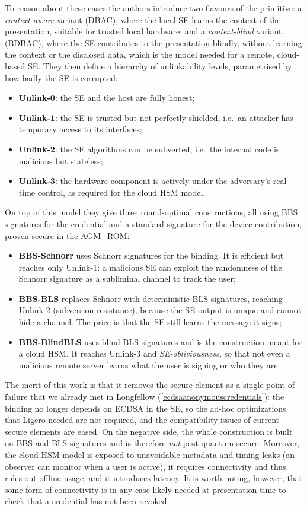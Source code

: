 \documentclass{article}
\begin{document}
To reason about these cases the authors introduce two flavours of the primitive: a \emph{context-aware} variant (DBAC),
where the local SE learns the context of the presentation, suitable for trusted local hardware; and a
\emph{context-blind} variant (BDBAC), where the SE contributes to the presentation blindly, without learning the
context or the disclosed data, which is the model needed for a remote, cloud-based SE. They then define a hierarchy of
unlinkability levels, parametrised by how badly the SE is corrupted:
\begin{itemize}[noitemsep]
  \item \textbf{Unlink-0}: the SE and the host are fully honest;
  \item \textbf{Unlink-1}: the SE is trusted but not perfectly shielded, i.e.\ an attacker has temporary access to its interfaces;
  \item \textbf{Unlink-2}: the SE algorithms can be subverted, i.e.\ the internal code is malicious but stateless;
  \item \textbf{Unlink-3}: the hardware component is actively under the adversary's real-time control, as required for the cloud HSM model.
\end{itemize}

On top of this model they give three round-optimal constructions, all using BBS signatures for the credential and a
standard signature for the device contribution, proven secure in the AGM+ROM:
\begin{itemize}[noitemsep]
  \item \textbf{BBS-Schnorr} uses Schnorr signatures for the binding. It is efficient but reaches only Unlink-1: a
        malicious SE can exploit the randomness of the Schnorr signature as a subliminal channel to track the user;
  \item \textbf{BBS-BLS} replaces Schnorr with deterministic BLS signatures, reaching Unlink-2 (subversion resistance),
        because the SE output is unique and cannot hide a channel. The price is that the SE still learns the message it signs;
  \item \textbf{BBS-BlindBLS} uses blind BLS signatures and is the construction meant for a cloud HSM. It reaches
        Unlink-3 and \emph{SE-obliviousness}, so that not even a malicious remote server learns what the user is signing or who they are.
\end{itemize}

The merit of this work is that it removes the secure element as a single point of failure that we already met in
Longfellow (\cref{ecdsaanonymouscredentials}): the binding no longer depends on ECDSA in the SE, so the ad-hoc
optimizations that Ligero needed are not required, and the compatibility issues of current secure elements are eased.
On the negative side, the whole construction is built on BBS and BLS signatures and is therefore \emph{not}
post-quantum secure. Moreover, the cloud HSM model is exposed to unavoidable metadata and timing leaks (an observer can
monitor when a user is active), it requires connectivity and thus rules out offline usage, and it introduces latency.
It is worth noting, however, that some form of connectivity is in any case likely needed at presentation time to check
that a credential has not been revoked.
\end{document}
